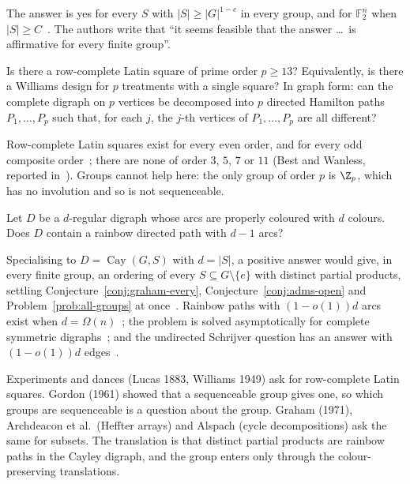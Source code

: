 The answer is yes for every $S$ with $|S|\geq|G|^{1-c}$ in every group, and for $\mathbb F_2^n$ when $|S|\geq C$~\cite{bbkmm25}. The authors write that ``it seems feasible that the answer \dots\ is affirmative for every finite group''.

\begin{problem}\label{prob:row-complete-prime}
Is there a row-complete Latin square of prime order $p\geq13$? Equivalently, is there a Williams design for $p$ treatments with a single square? In graph form: can the complete digraph on $p$ vertices be decomposed into $p$ directed Hamilton paths $P_1,\dots,P_p$ such that, for each $j$, the $j$-th vertices of $P_1,\dots,P_p$ are all different?
\end{problem}

Row-complete Latin squares exist for every even order, and for every odd composite order~\cite{hig98}; there are none of order $3$, $5$, $7$ or $11$ (Best and Wanless, reported in~\cite[\S3.6]{oll25}). Groups cannot help here: the only group of order $p$ is $\Z_p$, which has no involution and so is not sequenceable.

\begin{problem}\label{prob:directed-schrijver}
Let $D$ be a $d$-regular digraph whose arcs are properly coloured with $d$ colours. Does $D$ contain a rainbow directed path with $d-1$ arcs?
\end{problem}

Specialising to $D=\operatorname{Cay}(G,S)$ with $d=|S|$, a positive answer would give, in every finite group, an ordering of every $S\subseteq G\setminus\{e\}$ with distinct partial products, settling Conjecture~\ref{conj:graham-every}, Conjecture~\ref{conj:adms-open} and Problem~\ref{prob:all-groups} at once~\cite[\S1]{bfmpy25}. Rainbow paths with $(1-o(1))d$ arcs exist when $d=\Omega(n)$~\cite[Theorem~1.7]{bfmpy25}; the problem is solved asymptotically for complete symmetric digraphs~\cite{bps20}; and the undirected Schrijver question has an answer with $(1-o(1))d$ edges~\cite[Theorem~1.5]{bfmpy25}.


Experiments and dances (Lucas 1883, Williams 1949) ask for row-complete Latin squares. Gordon (1961) showed that a sequenceable group gives one, so which groups are sequenceable is a question about the group. Graham (1971), Archdeacon et al.\ (Heffter arrays) and Alspach (cycle decompositions) ask the same for subsets. The translation is that distinct partial products are rainbow paths in the Cayley digraph, and the group enters only through the colour-preserving translations.
